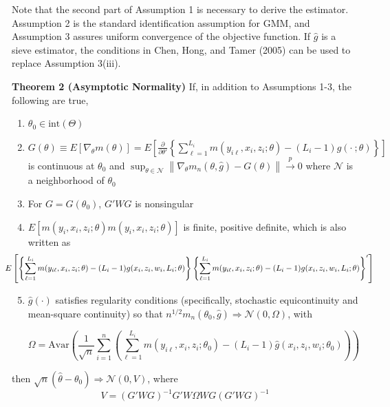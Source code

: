 \documentclass[12pt]{article}
\newcommand{\toP}{\overset{p}{\to}}
\begin{document}
Note that the second part of Assumption 1 is necessary to derive the estimator.  Assumption 2 is the standard identification assumption for GMM, and Assumption 3 assures uniform convergence of the  objective function.  If $\hat{g}$ is a sieve estimator, the conditions in Chen, Hong, and Tamer (2005) can be used to replace Assumption 3(iii). 



\textbf{Theorem 2 (Asymptotic Normality)} If, in addition to Assumptions 1-3, the following are true,
\begin{enumerate}[resume]
    \item $\theta_0 \in \text{int}(\Theta)$
    \item $G(\theta) \equiv E\left[\nabla_{\theta} m(\theta)\right] = E\left[\frac{\partial}{\partial \theta'} \left\{ \sum_{\ell=1}^{L_i} m(y_{i\ell}, x_i,z_i; \theta) - (L_i -1)g(\cdot\ ;\theta)\right\}\right]$ is continuous at $\theta_0$ and $\sup_{\theta\in \mathcal{N}} \left\lVert \nabla_{\theta}m_n(\theta,\hat{g}) - G(\theta)\right\rVert \toP 0 $ where $\mathcal{N}$ is a neighborhood of $\theta_0$
    \item For $G=G(\theta_0)$, $G'WG$ is nonsingular 
    \item $E\left[m(y_i, x_i, z_i; \theta)m(y_i, x_i, z_i; \theta)\right]$ is finite, positive definite, which is also written as
$$\hspace{-30pt} E\left[\left\{\sum_{\ell=1}^{L_i} m(y_{i\ell},x_i, z_i; \theta) - (L_i -1) g(x_i,z_i, w_i, L_i; \theta)\right\} \left\{ \sum_{\ell=1}^{L_i} m(y_{i\ell},x_i, z_i; \theta) - (L_i -1) g(x_i,z_i, w_i, L_i; \theta)\right\}'\right] $$
\item $\hat{g}(\cdot)$ satisfies regularity conditions (specifically, stochastic equicontinuity and mean-square continuity) so that $n^{1/2}m_n(\theta_0, \hat{g}) \Rightarrow \mathcal{N}(0,\Omega)$, with

$$ \Omega = \text{Avar}\left(\frac{1}{\sqrt{n}}\sum_{i=1}^n \left( \sum_{\ell =1}^{L_i} m(y_{i\ell}, x_i, z_i; \theta_0) - (L_i-1) \hat{g}(x_i, z_i, w_i; \theta_0)\right)  \right) $$

\end{enumerate}

then $\sqrt{n}(\hat{\theta}-\theta_0) \Rightarrow \mathcal{N}(0,V)$, where 
\begin{equation} V = (G'WG)^{-1}G'W\Omega W G(G'WG)^{-1} \label{avar}\end{equation}
\end{document}

